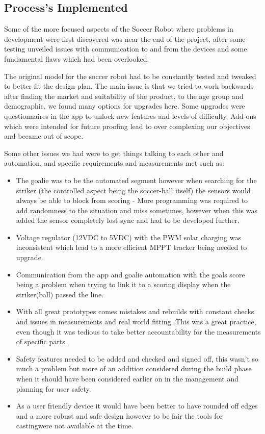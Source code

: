 \documentclass[a4paper, 10pt]{IEEEconf}
\begin{document}

\subsection{Process's Implemented}


Some of the more focused aspects of the Soccer Robot where problems in development were first discovered was near the end of the project, after some testing unveiled issues with communication to and from the devices and some fundamental flaws which had been overlooked. 

The original model for the soccer robot had to be constantly tested and tweaked to better fit the design plan. The main issue is that we tried to work backwards after finding the market and suitability of the product, to the age group and demographic, we found many options for upgrades here. Some upgrades were questionnaires in the app to unlock new features and levels of difficulty. Add-ons which were intended for future proofing lead to over complexing our objectives and became out of scope.

Some other issues we had were to get things talking to each other and automation, and specific requirements and measurements met such as:
\begin{itemize}
	\item The goalie was to be the automated segment however when searching for the striker (the controlled aspect being the soccer-ball itself) the sensors would always be able to block from scoring - More programming was required to add randomness to the situation and miss sometimes, however when this was added the sensor completely lost sync and had to be developed further.
	\\
	\item Voltage regulator (12VDC to 5VDC) with the PWM solar charging was inconsistent which lead to a more efficient MPPT tracker being needed to upgrade.
	\item Communication from the app and goalie automation with the goals score being a problem when trying to link it to a scoring display when the striker(ball) passed the line.
	\item With all great prototypes comes mistakes and rebuilds with constant checks and issues in measurements and real world fitting. This was a great practice, even though it was tedious to take better accountability for the measurements of specific parts.
	\item Safety features needed to be added and checked and signed off, this wasn't so much a problem but more of an addition considered during the build phase when it should have been considered earlier on in the management and planning for user safety.
	\item As a user friendly device it would have been better to have rounded off edges and a more robust and safe design however to be fair the tools for castingwere not available at the time.
\end{itemize}
\end{document}
